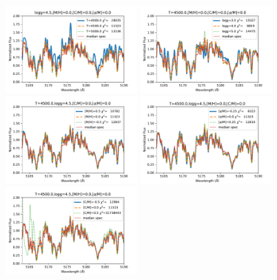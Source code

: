 \documentclass[preprint]{aastex61}
\begin{document}

\begin{figure}[!hbtp]
\begin{centering}
\includegraphics[width=0.45\textwidth]{images/bosz_model_exploration/T_EFF_exploration.pdf}
\includegraphics[width=0.45\textwidth]{images/bosz_model_exploration/LOGG_exploration}
\includegraphics[width=0.45\textwidth]{images/bosz_model_exploration/MH_exploration.pdf}
\includegraphics[width=0.45\textwidth]{images/bosz_model_exploration/ALPHA_exploration.pdf}
\includegraphics[width=0.45\textwidth]{images/bosz_model_exploration/CM_exploration.pdf}

\end{centering}
\end{figure}
\end{document}
